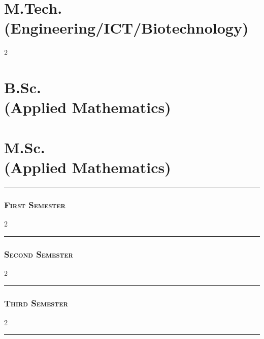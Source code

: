 \documentclass[12pt]{article}
\newcommand{\cols}{2}
\begin{document}
\part{\normalsize M.Tech. \\(Engineering/ICT/Biotechnology)}
\begin{multicols}{\cols}
\end{multicols}
\newpage
\part{\normalsize B.Sc. \\(Applied Mathematics)}
\newpage
\part{\normalsize M.Sc. \\(Applied Mathematics)}
\newpage
\rule{100mm}{3pt}
\section{\scshape First Semester}

\begin{multicols}{\cols}
\end{multicols}
\rule{100mm}{3pt}
\section{\scshape  Second Semester}
\begin{multicols}{\cols}
\end{multicols}
\rule{100mm}{3pt}
\section{\scshape  Third Semester}
\begin{multicols}{\cols}

\end{multicols}
\rule{100mm}{3pt}
\end{document}
